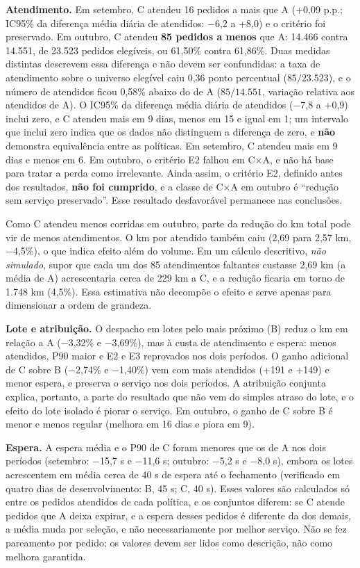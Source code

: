 \textbf{Atendimento.} Em setembro, C atendeu 16 pedidos a mais que A (+0,09 p.p.; IC95\% da diferença média diária de atendidos: −6,2 a +8,0) e o critério foi preservado. Em outubro, C atendeu \textbf{85 pedidos a menos} que A: 14.466 contra 14.551, de 23.523 pedidos elegíveis, ou 61,50\% contra 61,86\%. Duas medidas distintas descrevem essa diferença e não devem ser confundidas: a taxa de atendimento sobre o universo elegível caiu 0,36 ponto percentual ($85/23.523$), e o número de atendidos ficou 0,58\% abaixo do de A ($85/14.551$, variação relativa aos atendidos de A). O IC95\% da diferença média diária de atendidos (−7,8 a +0,9) inclui zero, e C atendeu mais em 9 dias, menos em 15 e igual em 1; um intervalo que inclui zero indica que os dados não distinguem a diferença de zero, e \textbf{não} demonstra equivalência entre as políticas. Em setembro, C atendeu mais em 9 dias e menos em 6. Em outubro, o critério E2 falhou em C×A, e não há base para tratar a perda como irrelevante. Ainda assim, o critério E2, definido antes dos resultados, \textbf{não foi cumprido}, e a classe de C×A em outubro é \enquote{redução sem serviço preservado}. Esse resultado desfavorável permanece nas conclusões.

Como C atendeu menos corridas em outubro, parte da redução do km total pode vir de menos atendimentos. O km por atendido também caiu (2,69 para 2,57 km, −4,5\%), o que indica efeito além do volume. Em um cálculo descritivo, \emph{não simulado}, supor que cada um dos 85 atendimentos faltantes custasse 2,69 km (a média de A) acrescentaria cerca de 229 km a C, e a redução ficaria em torno de 1.748 km (4,5\%). Essa estimativa não decompõe o efeito e serve apenas para dimensionar a ordem de grandeza.

\textbf{Lote e atribuição.} O despacho em lotes pelo mais próximo (B) reduz o km em relação a A (−3,32\% e −3,69\%), mas à custa de atendimento e espera: menos atendidos, P90 maior e E2 e E3 reprovados nos dois períodos. O ganho adicional de C sobre B (−2,74\% e −1,40\%) vem com mais atendidos (+191 e +149) e menor espera, e preserva o serviço nos dois períodos. A atribuição conjunta explica, portanto, a parte do resultado que não vem do simples atraso do lote, e o efeito do lote isolado é piorar o serviço. Em outubro, o ganho de C sobre B é menor e menos regular (melhora em 16 dias e piora em 9).

\textbf{Espera.} A espera média e o P90 de C foram menores que os de A nos dois períodos (setembro: −15,7 s e −11,6 s; outubro: −5,2 s e −8,0 s), embora os lotes acrescentem em média cerca de 40 s de espera até o fechamento (verificado em quatro dias de desenvolvimento: B, 45 s; C, 40 s). Esses valores são calculados só entre os pedidos atendidos de cada política, e os conjuntos diferem: se C atende pedidos que A deixa expirar, e a espera desses pedidos é diferente da dos demais, a média muda por seleção, e não necessariamente por melhor serviço. Não se fez pareamento por pedido; os valores devem ser lidos como descrição, não como melhora garantida.

